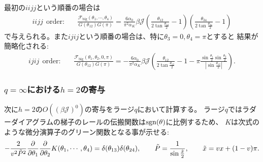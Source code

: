 最初の$iijj$という順番の場合は
\begin{align}
	iijj\ \ \mathrm{order:}\hspace{20pt}
	\frac{\mathcal{F}_{\mathrm{big}}(\theta_1, \cdots, \theta_4)}{G(\theta_{12})G(\pi)}
	= \frac{6\alpha_0}{\pi^2\alpha_K}\beta\mathcal{J}
		\left(
			\frac{\theta_{12}}{2\tan\frac{\theta_{12}}{2}} - 1
		\right)
		\left(
			\frac{\theta_{34}}{2\tan\frac{\theta_{34}}{2}} - 1
		\right)
	\label{eq:h_2_contribution_in_iijj_order}
\end{align}
で与えられる。また$ijij$という順番の場合は、特に$\theta_3 = 0, \theta_4 = \pi$とすると
結果が簡略化される:
\begin{align}
	ijij\ \ \mathrm{order:}\hspace{20pt}
	\frac{\mathcal{F}_{\mathrm{big}}(\theta_1, \theta_2, 0, \pi)}{G(\theta_{12})G(\pi)}
	= - \frac{6\alpha_0}{\pi^2\alpha_K}\beta\mathcal{J}
		\left(
			\frac{\theta_{12}}{2\tan\frac{\theta_{12}}{2}} - 1
			- \pi \frac{\sin\frac{\theta_1}{2}\sin\frac{\theta_2}{2}}{|\sin\frac{\theta_{12}}{2}|}
		\right).
	\label{eq:h_2_contribution_in_ijij_order}
\end{align}

\subsubsection{$q=\infty$における$h=2$の寄与}
次に$h=2$の$O((\beta\mathcal{J})^0)$の寄与をラージ$q$において計算する。
ラージ$q$ではラダーダイアグラムの梯子のレールの伝搬関数は$\mathrm{sgn}(\theta)$に比例するため、
$K$は次式のような微分演算子のグリーン関数となる事が示せる:
\begin{align}
	-\frac{2}{v^2\tilde{P}^2}\frac{\partial}{\partial \theta_1}\frac{\partial}{\partial \theta_2}K(\theta_1, \cdots, \theta_4)
	= \delta(\theta_{13})\delta(\theta_{24}),\hspace{20pt}
	\tilde{P} = \frac{1}{\sin\frac{\tilde{x}}{2}},\hspace{20pt}
	\tilde{x} = vx + (1 - v)\pi.
\end{align}

